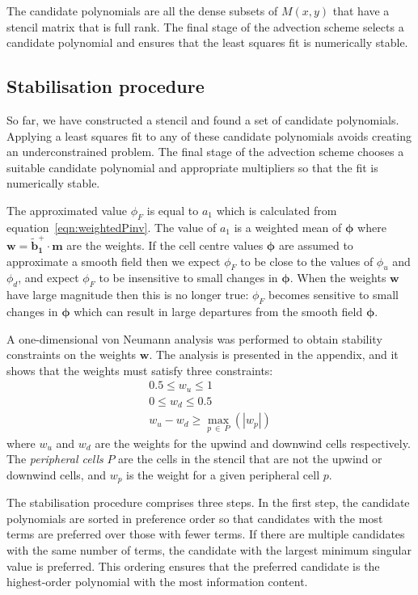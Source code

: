 The candidate polynomials are all the dense subsets of $M(x,y)$ that have a stencil matrix that is full rank.  The final stage of the advection scheme selects a candidate polynomial and ensures that the least squares fit is numerically stable.

\subsection{Stabilisation procedure}
So far, we have constructed a stencil and found a set of candidate polynomials.  Applying a least squares fit to any of these candidate polynomials avoids creating an underconstrained problem.  The final stage of the advection scheme chooses a suitable candidate polynomial and appropriate multipliers so that the fit is numerically stable.

The approximated value $\phi_F$ is equal to $a_1$ which is calculated from equation~\eqref{eqn:weightedPinv}.  The value of $a_1$ is a weighted mean of $\bm{\phi}$ where $\mathbf{w} = \mathbf{\tilde{b}_1^+} \cdot \mathbf{m}$ are the weights.
If the cell centre values $\bm{\phi}$ are assumed to approximate a smooth field then we expect $\phi_F$ to be close to the values of $\phi_u$ and $\phi_d$, and expect $\phi_F$ to be insensitive to small changes in $\bm{\phi}$.  When the weights $\mathbf{w}$ have large magnitude then this is no longer true: $\phi_F$ becomes sensitive to small changes in $\bm{\phi}$ which can result in large departures from the smooth field $\bm{\phi}$.

A one-dimensional von Neumann analysis was performed to obtain stability constraints on the weights $\mathbf{w}$.  The analysis is presented in the appendix, and it shows that the weights must satisfy three constraints:
\begin{subequations}
\label{eqn:stability}
\begin{align}
	0.5 \leq w_u \leq 1 \label{eqn:stabilityU} \\
	0 \leq w_d \leq 0.5 \label{eqn:stabilityD} \\
	w_u - w_d \geq \max_{p\:\in\:P}(|w_p|)
\end{align}
\end{subequations}
where $w_u$ and $w_d$ are the weights for the upwind and downwind cells respectively.  The \textit{peripheral cells} $P$ are the cells in the stencil that are not the upwind or downwind cells, and $w_p$ is the weight for a given peripheral cell $p$.

The stabilisation procedure comprises three steps.  In the first step, the candidate polynomials are sorted in preference order so that candidates with the most terms are preferred over those with fewer terms.
If there are multiple candidates with the same number of terms, the candidate with the largest minimum singular value is preferred.  This ordering ensures that the preferred candidate is the highest-order polynomial with the most information content.

